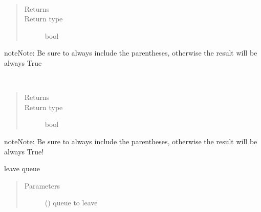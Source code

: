 \documentclass[letterpaper,10pt,english]{sphinxmanual}
\begin{document}
\begin{fulllineitems}
\begin{fulllineitems}
\label{\detokenize{Reference:salabim.Component.isstandby}}~\begin{quote}\begin{description}
\item[{Returns}] \leavevmode
{}

\item[{Return type}] \leavevmode
bool

\end{description}\end{quote}

\begin{sphinxadmonition}{note}{Note:}
Be sure to always include the parentheses, otherwise the result will be always True
\end{sphinxadmonition}

\end{fulllineitems}


\begin{fulllineitems}
\label{\detokenize{Reference:salabim.Component.iswaiting}}~\begin{quote}\begin{description}
\item[{Returns}] \leavevmode
{}

\item[{Return type}] \leavevmode
bool

\end{description}\end{quote}

\begin{sphinxadmonition}{note}{Note:}
Be sure to always include the parentheses, otherwise the result will be always True!
\end{sphinxadmonition}

\end{fulllineitems}


\begin{fulllineitems}
\label{\detokenize{Reference:salabim.Component.leave}}
leave queue
\begin{quote}\begin{description}
\item[{Parameters}] \leavevmode
{} ({\hyperref[\detokenize{Reference:salabim.Queue}]{}}) \textendash{} queue to leave


\end{description}
\end{quote}
\end{fulllineitems}
\end{fulllineitems}
\end{document}
